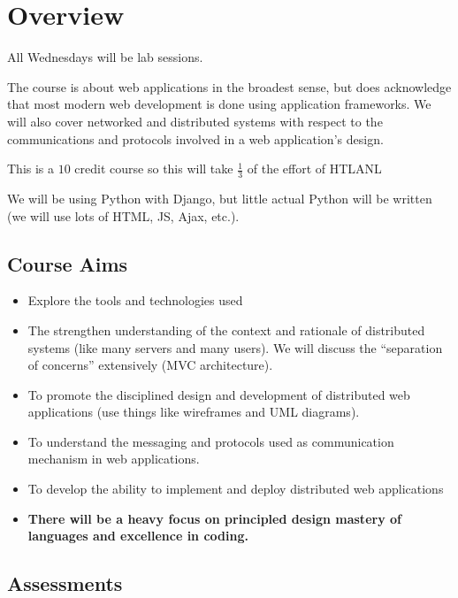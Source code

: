 \section{Overview}\label{sec:was_overview}

All Wednesdays will be lab sessions.

The course is about web applications in the broadest sense, but does acknowledge that most modern web development is done using application frameworks.
We will also cover networked and distributed systems with respect to the communications and protocols involved in a web application's design.

This is a \(10\) credit course so this will take \(\frac{1}{3}\) of the effort of HTLANL

We will be using Python with Django, but little actual Python will be written (we will use lots of HTML, JS, Ajax, etc.).

\subsection{Course Aims}\label{sub:course_aims}

\begin{itemize}
	\item Explore the tools and technologies used
	\item The strengthen understanding of the context and rationale of distributed systems (like many servers and many users).
	      We will discuss the ``separation of concerns'' extensively (MVC architecture).
	\item To promote the disciplined design and development of distributed web applications (use things like wireframes and UML diagrams).
	\item To understand the messaging and protocols used as communication mechanism in web applications.
	\item To develop the ability to implement and deploy distributed web applications
	\item \textbf{There will be a heavy focus on principled design mastery of languages and excellence in coding.}
\end{itemize}

\subsection{Assessments}\label{sub:was_assessments}

